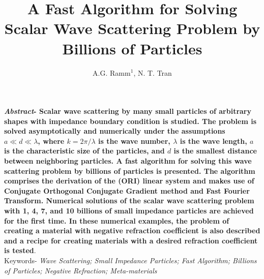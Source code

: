 \documentclass{wap}
\title{\fontsize{24}{24} \selectfont A Fast Algorithm for Solving Scalar Wave Scattering Problem by Billions of Particles 
}
\author[2]{\fontsize{11}{11} \selectfont A.G. Ramm$\mbox{}^1$, N. T. Tran}
\affil[1,2]{\normalsize Department of Mathematics, Kansas State University, Manhattan, KS 66506-2602, USA}
\date{\vspace{-0.6cm}{\normalsize
$\mbox{}^1$ramm@math.ksu.edu; $\mbox{}^2$nhantran@math.ksu.edu;
}}
\begin{document}
\maketitle
\thispagestyle{fancy}
\vspace{0.6em}

\noindent
{\bf\small
\textit{Abstract}-
Scalar wave scattering by many small particles of arbitrary shapes
with impedance boundary condition is studied. The problem is solved asymptotically and numerically under the assumptions $ a \ll d \ll \lambda$, where $k = 2\pi/\lambda$ is the wave number, $\lambda$ is the wave length, $a$ is the characteristic size of the particles, and $d$ is the smallest distance between neighboring particles. A fast algorithm for solving this wave scattering problem by billions of particles is presented. The algorithm comprises the derivation of the (ORI) linear system and makes use of Conjugate Orthogonal Conjugate Gradient method and Fast Fourier Transform. Numerical solutions of the scalar wave scattering problem with 1, 4, 7, and 10 billions of small impedance particles are achieved for the first time. In these numerical examples, the problem of creating a material with negative refraction coefficient is also described and a recipe for creating materials with a desired refraction coefficient is tested}.\vspace{0.6em}\\
\hspace*{\parindent}Keywords-
\textit{Wave Scattering; Small Impedance Particles; Fast Algorithm; Billions of Particles; Negative Refraction; Meta-materials}\vspace{0.6em}


\end{document}
